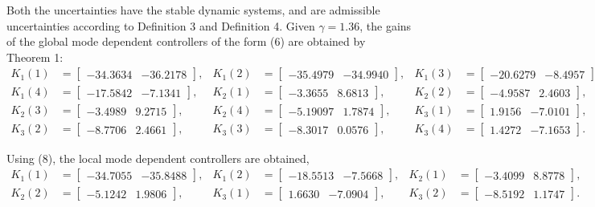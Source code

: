 \documentclass[11pt,draftcls,onecolumn]{IEEEtran}
\begin{document}
Both the uncertainties have the stable dynamic systems, and are admissible uncertainties according to Definition 3 and Definition 4.  Given $\gamma=1.36$, the gains of the global mode dependent controllers of the form (6) are obtained by  Theorem 1:
\begin{align*}
K_1(1)&=\begin{bmatrix}-34.3634 & -36.2178\end{bmatrix},
&K_1(2)&=\begin{bmatrix}-35.4979 & -34.9940\end{bmatrix},
&K_1(3)&=\begin{bmatrix}-20.6279 & -8.4957\end{bmatrix},\\
K_1(4)&=\begin{bmatrix}-17.5842 & -7.1341\end{bmatrix},
&K_2(1)&=\begin{bmatrix}-3.3655 & 8.6813\end{bmatrix},
&K_2(2)&=\begin{bmatrix}-4.9587 & 2.4603\end{bmatrix},\\
K_2(3)&=\begin{bmatrix}-3.4989 & 9.2715\end{bmatrix},
&K_2(4)&=\begin{bmatrix}-5.19097 & 1.7874\end{bmatrix},
&K_3(1)&=\begin{bmatrix}1.9156 & -7.0101\end{bmatrix},\\
K_3(2)&=\begin{bmatrix}-8.7706 & 2.4661\end{bmatrix},
&K_3(3)&=\begin{bmatrix}-8.3017 & 0.0576\end{bmatrix},
&K_3(4)&=\begin{bmatrix}1.4272 & -7.1653\end{bmatrix}.
\end{align*}

Using (8), the local mode dependent controllers are obtained,
 \begin{align*}
 K_1(1)&=\begin{bmatrix}-34.7055 &    -35.8488\end{bmatrix},
 &K_1(2)&=\begin{bmatrix}-18.5513 &    -7.5668\end{bmatrix},
 &K_2(1)&=\begin{bmatrix}-3.4099 & 8.8778\end{bmatrix},\\
 K_2(2)&=\begin{bmatrix}-5.1242 &     1.9806\end{bmatrix},
 &K_3(1)&=\begin{bmatrix}1.6630 & -7.0904\end{bmatrix},
 &K_3(2)&=\begin{bmatrix}-8.5192 & 1.1747\end{bmatrix}.
\end{align*}
\end{document}

